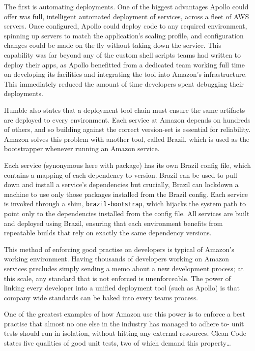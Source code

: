 \documentclass[11pt]{article}
\begin{document}
The first is automating deployments. One of the biggest advantages Apollo could
offer was full, intelligent automated deployment of services, across a fleet of
AWS servers. Once configured, Apollo could deploy code to any required
environment, spinning up servers to match the application's scaling profile, and
configuration changes could be made on the fly without taking down the service.
This capability was far beyond any of the custom shell scripts teams had written
to deploy their apps, as Apollo benefitted from a dedicated team working full
time on developing its facilities and integrating the tool into Amazon's
infrastructure. This immediately reduced the amount of time developers spent
debugging their deployments.

Humble also states that a deployment tool chain must ensure the same artifacts
are deployed to every environment. Each service at Amazon depends on hundreds of
others, and so building against the correct version-set is essential for
reliability. Amazon solves this problem with another tool, called Brazil, which
is used as the bootstrapper whenever running an Amazon service.

Each service (synonymous here with package) has its own Brazil config file,
which contains a mapping of each dependency to version. Brazil can be used to
pull down and install a service's dependencies but crucially, Brazil can
lockdown a machine to use only those packages installed from the Brazil config.
Each service is invoked through a shim, \texttt{brazil-bootstrap}, which hijacks
the system path to point only to the dependencies installed from the config
file.  All services are built and deployed using Brazil, ensuring that each
environment benefits from repeatable builds that rely on exactly the same
dependency versions.

This method of enforcing good practise on developers is typical of Amazon's
working environment. Having thousands of developers working on Amazon services
precludes simply sending a memo about a new development process; at this scale,
any standard that is not enforced is unenforceable. The power of linking every
developer into a unified deployment tool (such as Apollo) is that company wide
standards can be baked into every teams process.

One of the greatest examples of how Amazon use this power is to enforce a best
practise that almost no one else in the industry has managed to adhere to- unit
tests should run in isolation, without hitting any external resources. Clean
Code~\cite{cleanCode} states five qualities of good unit tests, two of which
demand this property\dots
\end{document}
